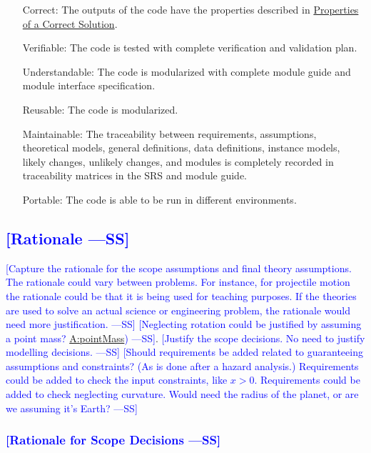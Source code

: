 \documentclass[12pt]{article}
\newcommand{\authornote}[3]{\textcolor{#1}{[#3 ---#2]}}
\newcommand{\authornote}[3]{}
\newcommand{\wss}[1]{\authornote{blue}{SS}{#1}}
\begin{document}
\begin{itemize}
\item[Correct:\phantomsection\label{correct}]{The outputs of the code have the properties described in \hyperref[Sec:CorSolProps]{Properties of a Correct Solution}.}
\item[Verifiable:\phantomsection\label{verifiable}]{The code is tested with complete verification and validation plan.}
\item[Understandable:\phantomsection\label{understandable}]{The code is modularized with complete module guide and module interface specification.}
\item[Reusable:\phantomsection\label{reusable}]{The code is modularized.}
\item[Maintainable:\phantomsection\label{maintainable}]{The traceability between requirements, assumptions, theoretical models, general definitions, data definitions, instance models, likely changes, unlikely changes, and modules is completely recorded in traceability matrices in the SRS and module guide.}
\item[Portable:\phantomsection\label{portable}]{The code is able to be run in different environments.}
\end{itemize}
\subsection{\wss{Rationale}}
\wss{Capture the rationale for the scope assumptions and final theory
assumptions.  The rationale could vary between problems.  For instance, for
projectile motion the rationale could be that it is being used for teaching
purposes.  If the theories are used to solve an actual science or engineering
problem, the rationale would need more justification.}
\wss{Neglecting rotation could be justified by assuming a point mass? \hyperref[pointMass]{A:pointMass})}. \wss{Justify the scope decisions.  No need to justify modelling decisions.}
\wss{Should requirements be added related to guaranteeing assumptions and
constraints?  (As is done after a hazard analysis.)  Requirements could be added
to check the input constraints, like $x > 0$. Requirements could be added to
check neglecting curvature.  Would need the radius of the planet, or are we
assuming it's Earth?}

\subsubsection{\wss{Rationale for Scope Decisions}}
\end{document}
